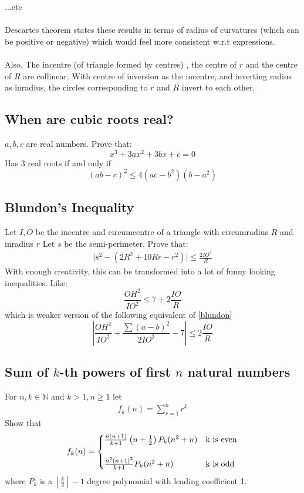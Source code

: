 \documentclass{article}
\begin{document}
...etc
\\\\
Descartes theorem states these results in terms of radius of curvatures (which can be positive or negative) which would feel more consistent w.r.t expressions.
\\\\
Also, The incentre (of triangle formed by centres) , the centre of $r$ and the centre of $R$ are collinear. With centre of inversion as the incentre, and inverting radius as inradius, the circles corresponding to $r$ and $R$ invert to each other.

\subsection{When are cubic roots real?}
$a,b,c$ are real numbers. Prove that:
$$x^3+3ax^2+3bx+c=0$$
Has 3 real roots if and only if
$$(ab-c)^2 \leq 4(ac-b^2)(b-a^2)$$

\subsection{Blundon's Inequality}
Let $I,O$ be the incentre and circumcentre of a triangle with circumradius $R$ and inradius $r$
Let $s$ be the semi-perimeter.
Prove that:
\begin{align} \bigg | s^2-(2R^2 + 10 Rr - r^2) \bigg | \leq \frac {2 IO^3}{R} \label{blundon}\end{align}
With enough creativity, this can be transformed into a lot of funny looking inequalities. Like:
$$\frac {OH^2}{IO^2} \leq 7 + 2 \frac {IO}{R}$$
which is weaker version of the following equivalent of \eqref{blundon}
$$ \left| \frac {OH^2}{IO^2} + \frac {\sum (a-b)^2}{2 IO^2} - 7 \right| \leq 2 \frac {IO}{R}$$

\subsection{Sum of $k$-th powers of first $n$ natural numbers}

For $n,k \in \mathbb{N}$ and $k>1, n\geq 1$ let
\begin{align*}
    f_k(n) = \sum_{r=1}^{n} r^k
\end{align*}
Show that
\begin{align*}
    f_k(n) = \begin{cases}
    \frac{n(n+1)}{k+1}\left(n+\frac{1}{2}\right)P_k(n^2 + n) & $k$ \textrm{ is even} \\\\
    \frac{n^2(n+1)^2}{k+1}P_k(n^2 + n) & $k$ \textrm{ is odd} 
    \end{cases}
\end{align*}
where $P_k$ is a $\left\lfloor \frac{k}{2}\right\rfloor-1$ degree polynomial with leading coefficient 1.
\end{document}
